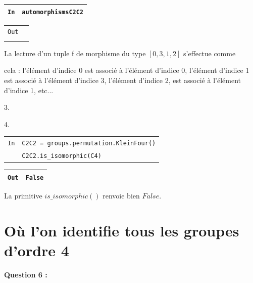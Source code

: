 \documentclass[titlepage]{article}
\begin{document}
    \begin{tabularx}{11.5cm}{|p{0.60cm}|X|}
        \hline
        \verb|In|
        & 
        \verb|automorphismsC2C2|
        \\
        \hline
    \end{tabularx}

    \begin{tabularx}{11.5cm}{|p{0.60cm}|X|}
        \hline
        \verb|Out|
        & 
        \verb|[[0, 1, 2, 3],
        [0, 1, 3, 2],
        [0, 2, 1, 3],
        |
        \\
        \verb||
        &
        \verb|[0, 2, 3, 1],
        [0, 3, 1, 2],
        [0, 3, 2, 1]]|
        \\
        \hline
    \end{tabularx}\newline

    La lecture d'un tuple f de morphisme du type $[0, 3, 1, 2]$ s'effectue comme 
    
    cela : l'élément d'indice 0 est associé à l'élément d'indice 0,
    l'élément d'indice 1 est associé à l'élément d'indice 3, l'élément d'indice 2, est associé à l'élément d'indice 1, etc...
    \newline

    3.

    4.
    \newline


    \begin{tabularx}{11.5cm}{|p{0.60cm}|X|}
        \hline
        \verb|In|
        & 
        \verb|C2C2 = groups.permutation.KleinFour()|
        \\
        \verb||
        &
        \verb|C2C2.is_isomorphic(C4)|
        \\
        \hline
    \end{tabularx}

    \begin{tabularx}{11.5cm}{|p{0.60cm}|X|}
        \hline
        \verb|Out|
        & 
        \verb|False|
        \\
        \hline
    \end{tabularx}\newline

    La primitive $is\_isomorphic()$ renvoie bien $False$.

    \section{Où l’on identifie tous les groupes d’ordre 4}
    \textbf{Question 6 :}
\end{document}
